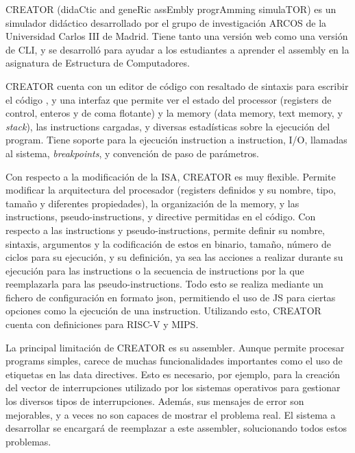 CREATOR (didaCtic and geneRic assEmbly progrAmming simulaTOR)
\parencite{CREATOR} es un simulador didáctico desarrollado por el grupo de
investigación ARCOS de la Universidad Carlos III de Madrid. Tiene tanto una
versión web como una versión de \gls{CLI}, y se desarrolló para ayudar a los
estudiantes a aprender el \gls{assembly} en la asignatura de Estructura de
Computadores.

CREATOR cuenta con un editor de código con resaltado de sintaxis para escribir
el código , y una interfaz que permite ver el
estado del \gls{processor} (\glspl{register} de control, enteros y de coma
flotante) y la \gls{memory} (\gls{data memory}, \gls{text memory}, y
\textit{stack}), las \glspl{instruction} cargadas, y diversas estadísticas sobre
la ejecución del \gls{program}. Tiene soporte para la ejecución
\gls{instruction} a \gls{instruction}, I/O, llamadas al sistema,
\textit{breakpoints}, y convención de paso de parámetros.

Con respecto a la modificación de la \gls{ISA}, CREATOR es muy flexible. Permite
modificar la arquitectura del procesador (\glspl{register} definidos y su
nombre, tipo, tamaño y diferentes propiedades), la organización de la
\gls{memory}, y las \glspl{instruction}, \glspl{pseudo-instruction}, y
\gls{directive} permitidas en el código. Con respecto a las \glspl{instruction}
y \glspl{pseudo-instruction}, permite definir su nombre, sintaxis, argumentos y
la codificación de estos en binario, tamaño, número de ciclos para su ejecución,
y su definición, ya sea las acciones a realizar durante su ejecución para las
\glspl{instruction} o la secuencia de \glspl{instruction} por la que
reemplazarla para las \glspl{pseudo-instruction}. Todo esto se realiza mediante
un fichero de configuración en formato \gls{json}, permitiendo el uso de
\gls{JS} para ciertas opciones como la ejecución de una \gls{instruction}.
Utilizando esto, CREATOR cuenta con definiciones para RISC-V y MIPS.

La principal limitación de CREATOR es su \gls{assembler}. Aunque permite
procesar \glspl{program} simples, carece de muchas funcionalidades importantes
como el uso de etiquetas en las \glspl{data directive}. Esto es necesario, por
ejemplo, para la creación del vector de interrupciones utilizado por los
sistemas operativos para gestionar los diversos tipos de interrupciones. Además,
sus mensajes de error son mejorables, y a veces no son capaces de mostrar el
problema real. El sistema a desarrollar se encargará de reemplazar a este
\gls{assembler}, solucionando todos estos problemas.

